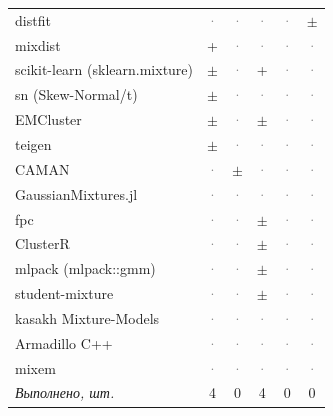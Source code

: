 \documentclass[10pt,a4paper]{article}
\begin{document}
\begin{landscape}
{\begin{longtable}{@{}l *{5}{c}@{}}
distfit & \textcolor{gray}{·} & \textcolor{gray}{·} & \textcolor{gray}{·} & \textcolor{gray}{·} & \cellcolor{part!45}$\pm$ \\
mixdist & \cellcolor{yes!35}+ & \textcolor{gray}{·} & \textcolor{gray}{·} & \textcolor{gray}{·} & \textcolor{gray}{·} \\
scikit-learn (sklearn.mixture) & \cellcolor{part!45}$\pm$ & \textcolor{gray}{·} & \cellcolor{yes!35}+ & \textcolor{gray}{·} & \textcolor{gray}{·} \\
sn (Skew-Normal/t) & \cellcolor{part!45}$\pm$ & \textcolor{gray}{·} & \textcolor{gray}{·} & \textcolor{gray}{·} & \textcolor{gray}{·} \\
EMCluster & \cellcolor{part!45}$\pm$ & \textcolor{gray}{·} & \cellcolor{part!45}$\pm$ & \textcolor{gray}{·} & \textcolor{gray}{·} \\
teigen & \cellcolor{part!45}$\pm$ & \textcolor{gray}{·} & \textcolor{gray}{·} & \textcolor{gray}{·} & \textcolor{gray}{·} \\
CAMAN & \textcolor{gray}{·} & \cellcolor{part!45}$\pm$ & \textcolor{gray}{·} & \textcolor{gray}{·} & \textcolor{gray}{·} \\
GaussianMixtures.jl & \textcolor{gray}{·} & \textcolor{gray}{·} & \textcolor{gray}{·} & \textcolor{gray}{·} & \textcolor{gray}{·} \\
fpc & \textcolor{gray}{·} & \textcolor{gray}{·} & \cellcolor{part!45}$\pm$ & \textcolor{gray}{·} & \textcolor{gray}{·} \\
ClusterR & \textcolor{gray}{·} & \textcolor{gray}{·} & \cellcolor{part!45}$\pm$ & \textcolor{gray}{·} & \textcolor{gray}{·} \\
mlpack (mlpack::gmm) & \textcolor{gray}{·} & \textcolor{gray}{·} & \cellcolor{part!45}$\pm$ & \textcolor{gray}{·} & \textcolor{gray}{·} \\
student-mixture & \textcolor{gray}{·} & \textcolor{gray}{·} & \cellcolor{part!45}$\pm$ & \textcolor{gray}{·} & \textcolor{gray}{·} \\
kasakh Mixture-Models & \textcolor{gray}{·} & \textcolor{gray}{·} & \textcolor{gray}{·} & \textcolor{gray}{·} & \textcolor{gray}{·} \\
Armadillo C++ & \textcolor{gray}{·} & \textcolor{gray}{·} & \textcolor{gray}{·} & \textcolor{gray}{·} & \textcolor{gray}{·} \\
mixem & \textcolor{gray}{·} & \textcolor{gray}{·} & \textcolor{gray}{·} & \textcolor{gray}{·} & \textcolor{gray}{·} \\
\midrule \textit{Выполнено, шт.} & 4 & 0 & 4 & 0 & 0 \\

\end{longtable}}
\end{landscape}
\end{document}
